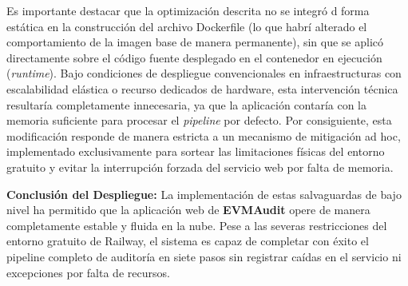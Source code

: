 Es importante destacar que la optimización descrita no se integró d
forma estática en la construcción del archivo Dockerfile (lo que habrí
alterado el comportamiento de la imagen base de manera permanente), sin
que se aplicó directamente sobre el código fuente desplegado en el
contenedor en ejecución (\emph{runtime}). Bajo condiciones de despliegue
convencionales en infraestructuras con escalabilidad elástica o recurso
dedicados de hardware, esta intervención técnica resultaría
completamente innecesaria, ya que la aplicación contaría con la memoria
suficiente para procesar el \emph{pipeline} por defecto. Por
consiguiente, esta modificación responde de manera estricta a un
mecanismo de mitigación ad hoc, implementado exclusivamente para sortear
las limitaciones físicas del entorno gratuito y evitar la interrupción
forzada del servicio web por falta de memoria.

\textbf{Conclusión del Despliegue:} La implementación de estas
salvaguardas de bajo nivel ha permitido que la aplicación web de
\textbf{EVMAudit} opere de manera completamente estable y fluida en la
nube. Pese a las severas restricciones del entorno gratuito de Railway,
el sistema es capaz de completar con éxito el pipeline completo de
auditoría en siete pasos sin registrar caídas en el servicio ni
excepciones por falta de recursos.
